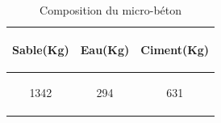 \documentclass{DGC_M2_report}
\begin{document}
\begin{table}[h]
\begin{center}
\begin{tabular}{ccc}
\hline
\begin{bf}                   Sable(Kg)         \end{bf} & \begin{bf}                   Eau(Kg)         \end{bf} & \begin{bf}                   Ciment(Kg)           \end{bf} \\
\hline 
\begin{bf}\rowcolor{cyan}1342\end{bf} & \begin{bf}294\end{bf} & \begin{bf}631\end{bf} \\
\hline 
\end{tabular}
\end{center}
\caption{Composition du micro-béton}
\label{micro-béton}
\end{table}
\end{document}
